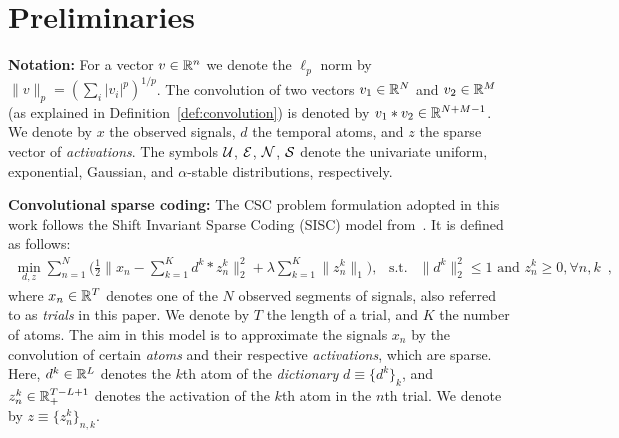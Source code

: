 




\section{Preliminaries}


\textbf{Notation:} For a vector $v \in \mathbb{R}^n$ we denote the $\ell_p$ norm by $\|v\|_p = \left(\sum_i |v_i|^p \right)^{1/p}$. The convolution of two vectors $v_1 \in \mathbb{R}^N$ and $v_2 \in \mathbb{R}^M$ (as explained in Definition~\ref{def:convolution}) is denoted by $v_1 \ast v_2 \in \mathbb{R}^{N + M - 1}$. We denote by $x$ the observed signals, $d$ the temporal atoms, and $z$ the sparse vector of \emph{activations}. The symbols ${\cal U}$, ${\cal E}$, ${\cal N}$, ${\cal S}$ denote the univariate uniform, exponential, Gaussian, and $\alpha$-stable distributions, respectively.

\textbf{Convolutional sparse coding:} 
The CSC problem formulation adopted in this work follows the Shift Invariant Sparse Coding (SISC) model from~\cite{Grosse-etal:2007}. It is defined as follows:
%
\begin{align}
 \min_{d, z} \sum_{n=1}^{N} \Big( \frac{1}{2}\|x_{n} - \sum_{k=1}^{K}d^{k} * z_{n}^{k}\|_{2}^{2} + \lambda \sum_{k=1}^K \|z_{n}^{k}\|_1 \Big), \hspace{9pt}
 \text{s.t. } \>\> \|d^{k}\|_2^2 \leq 1 \text{  and } z_n^k \geq 0, \forall n, k
\label{eq:problem_definition} \enspace ,
\end{align}
%
where $x_{n} \in \mathbb{R}^{T}$ denotes one of the $N$ observed segments of signals, also referred to as \emph{trials} in this paper. We denote by $T$ the length of a trial, and $K$ the number of atoms. The aim in this model is to approximate the signals $x_n$ by the convolution of certain \emph{atoms} and their respective \emph{activations}, which are sparse. Here, $d^{k} \in \mathbb{R}^{L}$ denotes the $k$th atom of the \emph{dictionary} $d \equiv \{d^k\}_{k}$, and $z_{n}^{k} \in \mathbb{R}_+^{T-L+1}$ denotes the activation of the $k$th atom in the $n$th trial. We denote by $z \equiv \{z_n^k\}_{n,k}$.

